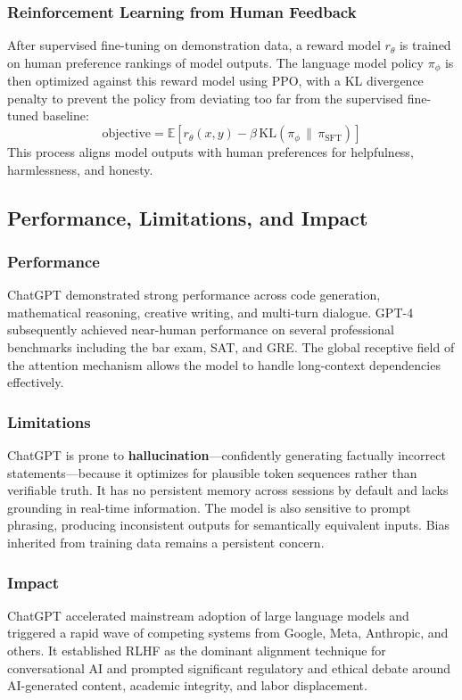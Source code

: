 \documentclass[11pt,a4paper]{report}
\begin{document}
\subsubsection{Reinforcement Learning from Human Feedback}
After supervised fine-tuning on demonstration data, a reward model $r_\theta$ is trained on human preference
rankings of model outputs. The language model policy $\pi_\phi$ is then optimized against this reward model
using PPO, with a KL divergence penalty to prevent the policy from deviating too far from the supervised
fine-tuned baseline:
\[
\text{objective} = \mathbb{E}\!\left[r_\theta(x, y) - \beta\, \text{KL}\!\left(\pi_\phi \,\|\, \pi_{\text{SFT}}\right)\right]
\]
This process aligns model outputs with human preferences for helpfulness, harmlessness, and honesty.

\subsection{Performance, Limitations, and Impact}

\subsubsection{Performance}
ChatGPT demonstrated strong performance across code generation, mathematical reasoning, creative writing, and
multi-turn dialogue. GPT-4 subsequently achieved near-human performance on several professional benchmarks
including the bar exam, SAT, and GRE. The global receptive field of the attention mechanism allows the model to
handle long-context dependencies effectively.

\subsubsection{Limitations}
ChatGPT is prone to \textbf{hallucination}---confidently generating factually incorrect statements---because it
optimizes for plausible token sequences rather than verifiable truth. It has no persistent memory across sessions
by default and lacks grounding in real-time information. The model is also sensitive to prompt phrasing,
producing inconsistent outputs for semantically equivalent inputs. Bias inherited from training data remains a
persistent concern.

\subsubsection{Impact}
ChatGPT accelerated mainstream adoption of large language models and triggered a rapid wave of competing systems
from Google, Meta, Anthropic, and others. It established RLHF as the dominant alignment technique for
conversational AI and prompted significant regulatory and ethical debate around AI-generated content, academic
integrity, and labor displacement.
\end{document}
